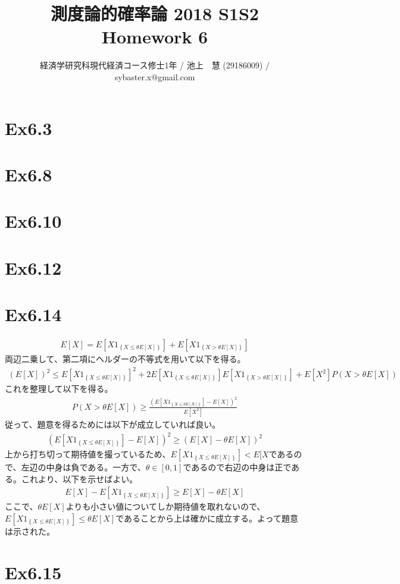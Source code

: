 \documentclass{article}
\begin{document}
\title{測度論的確率論 2018 S1S2 \\ 
Homework 6}
\author{経済学研究科現代経済コース修士1年 / 池上　慧 (29186009) / sybaster.x@gmail.com}
\maketitle

\section{Ex6.3}


\section{Ex6.8}

\section{Ex6.10}

\section{Ex6.12}

\section{Ex6.14}
\begin{align*}
	E[X] = E\left[ X 1_{\left\{ X \leq \theta E[X] \right\}} \right] + E\left[ X 1_{\left\{ X > \theta E[X] \right\}} \right]
\end{align*}
両辺二乗して、第二項にヘルダーの不等式を用いて以下を得る。
\begin{align*}
	\left( E[X] \right)^2 \leq E\left[ X 1_{\left\{ X \leq \theta E[X] \right\}} \right]^2 + 2 E\left[ X 1_{\left\{ X \leq \theta E[X] \right\}} \right] E\left[ X 1_{\left\{ X > \theta E[X] \right\}} \right] + E[X^2] P\left( X > \theta E[X] \right)
\end{align*}
これを整理して以下を得る。
\begin{align*}
	P\left( X > \theta E[X] \right) \geq \frac{\left( E\left[ X 1_{\left\{ X \leq \theta E[X] \right\}} \right] - E[X] \right)^2}{E[X^2]}
\end{align*}
従って、題意を得るためには以下が成立していれば良い。
\begin{align*}
	\left( E\left[ X 1_{\left\{ X \leq \theta E[X] \right\}} \right] - E[X] \right)^2 \geq \left( E[X] - \theta E[X] \right)^2
\end{align*}
上から打ち切って期待値を撮っているため、$E\left[ X 1_{\left\{ X \leq \theta E[X] \right\}} \right] < E[X$であるので、左辺の中身は負である。一方で、$\theta \in [0,1]$であるので右辺の中身は正である。これより、以下を示せばよい。
\begin{align*}
	E[X] - E\left[ X 1_{\left\{ X \leq \theta E[X] \right\}} \right]  \geq E[X] - \theta E[X] 
\end{align*}
ここで、$\theta E[X]$よりも小さい値についてしか期待値を取れないので、$E\left[ X 1_{\left\{ X \leq \theta E[X] \right\}} \right] \leq \theta E[X]$であることから上は確かに成立する。よって題意は示された。

\section{Ex6.15}
\end{document}
